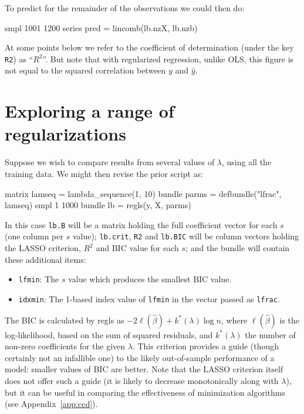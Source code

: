 \documentclass{article}
\begin{document}
To predict for the remainder of the observations we could then do:
\begin{code}
smpl 1001 1200
series pred = lincomb(lb.nzX, lb.nzb)
\end{code}

At some points below we refer to the coefficient of determination
(under the key \texttt{R2}) as ``$R^2$''. But note that with
regularized regression, unlike OLS, this figure is not equal to the
squared correlation between $y$ and $\hat{y}$.

\section{Exploring a range of regularizations}
\label{sec:simple-search}

Suppose we wish to compare results from several values of $\lambda$,
using all the training data. We might then revise the prior script as:
\begin{code}
matrix lamseq = lambda_sequence(1, 10)
bundle parms = defbundle("lfrac", lamseq)
smpl 1 1000
bundle lb = regls(y, X, parms)
\end{code}

In this case \texttt{lb.B} will be a matrix holding the full
coefficient vector for each $s$ (one column per $s$ value);
\texttt{lb.crit}, \texttt{R2} and \texttt{lb.BIC} will be column
vectors holding the LASSO criterion, $R^2$ and BIC value for each
$s$; and the bundle will contain these additional items:
\begin{itemize}
\item \texttt{lfmin}: The $s$ value which produces the smallest BIC
  value.
\item \texttt{idxmin}: The 1-based index value of \texttt{lfmin} in
  the vector passed as \texttt{lfrac}.
\end{itemize}

The BIC \citep{schwarz78} is calculated by \textsf{regls} as
$-2\ell(\hat{\beta}) + k^*(\lambda) \log n$, where $\ell(\hat{\beta})$
is the log-likelihood, based on the sum of squared residuals, and
$k^*(\lambda)$ the number of non-zero coefficients for the given
$\lambda$. This criterion provides a guide (though certainly not an
infallible one) to the likely out-of-sample performance of a model:
smaller values of BIC are better. Note that the LASSO criterion itself
does not offer such a guide (it is likely to decrease monotonically
along with $\lambda$), but it can be useful in comparing the
effectiveness of minimization algorithms (see Appendix~\ref{app:ccd}).
\end{document}
